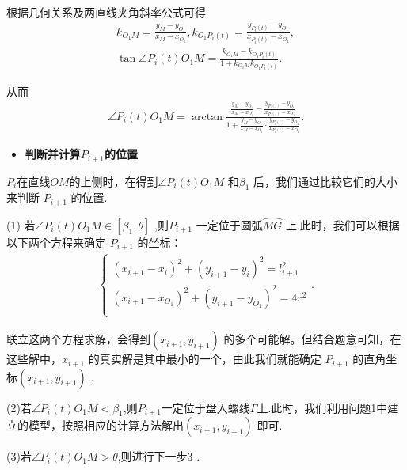 \documentclass[../main.tex]{subfiles}
\begin{document}
根据几何关系及两直线夹角斜率公式可得
\begin{gather}\label{1.........444}
k_{O_1M}=\frac{y_M-y_{O_1}}{x_M-x_{O_1}},k_{O_1P_i\left( t \right)}=\frac{y_{P_i\left( t \right)}-y_{O_1}}{x_{P_i\left( t \right)}-x_{O_1}},
\\
\tan \angle P_i(t)O_1M=\frac{k_{O_1M}-k_{O_1P_i\left( t \right)}}{1+k_{O_1M}k_{O_1P_i\left( t \right)}}.
\end{gather}
\par 从而
\begin{align}\label{1.........445}
\angle P_i(t)O_1M= \arctan \frac{\frac{y_M-y_{O_1}}{x_M-x_{O_1}}-\frac{y_{P_i\left( t \right)}-y_{O_1}}{x_{P_i\left( t \right)}-x_{O_1}}}{1+\frac{y_M-y_{O_1}}{x_M-x_{O_1}}\cdot \frac{y_{P_i\left( t \right)}-y_{O_1}}{x_{P_i\left( t \right)}-x_{O_1}}}.
\end{align}
\begin{itemize}
\item \textbf{判断并计算$P_{i+1}$的位置}\label{subsubsection4.4.1.2}
\end{itemize}
    \par \(P_i\)在直线\(OM\)的上侧时，在得到\(\angle P_{i}(t)O_{1}M\) 和\(\beta_{1}\) 后，我们通过比较它们的大小来判断 \(P_{i + 1}\) 的位置.
    \par (1) 若$ \angle P_i(t)O_1M\in \left[ \beta _1,\theta \right]$ ,则\(P_{i + 1}\) 一定位于圆弧\(\wideparen{MG}\) 上.此时，我们可以根据以下两个方程来确定 \(P_{i + 1}\) 的坐标：
    \begin{align}\label{1.........446}
        \left\{ \begin{array}{c}
        \left( x_{i+1}-x_i \right) ^2+\left( y_{i+1}-y_i \right) ^2=l_{i+1}^{2}\\
        \left( x_{i+1}-x_{O_1} \right) ^2+\left( y_{i+1}-y_{O_1} \right) ^2=4r^2\\
        \end{array} \right. .
        \end{align}
\par 联立这两个方程求解，会得到\((x_{i + 1}, y_{i + 1})\) 的多个可能解。但结合题意可知，在这些解中，\(x_{i + 1}\) 的真实解是其中最小的一个，由此我们就能确定 \(P_{i + 1}\) 的直角坐标\((x_{i + 1}, y_{i + 1})\) .
\par (2)若$\angle P_i(t)O_1M< \beta_1$,则$P_{i+1}$一定位于盘入螺线$\varGamma$上.此时，我们利用问题1中建立的模型，按照相应的计算方法解出\((x_{i + 1}, y_{i + 1})\) 即可.
\par (3)若$\angle P_i(t)O_1M>\theta $,则进行下一步3  .
\end{document}
